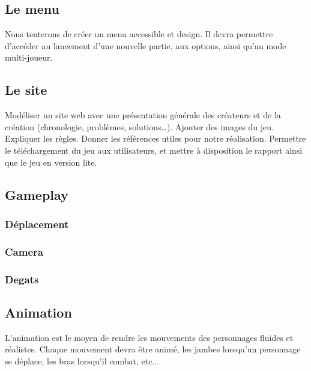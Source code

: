 \documentclass[a4paper, 12pt]{article}
\begin{document}
	\subsection{Le menu}
	Nous tenterons de créer un menu accessible et design. Il devra permettre d'accéder au lancement d’une nouvelle partie, aux options, ainsi qu’au mode multi-joueur. 
	\subsection{Le site}
	Modéliser un site web avec une présentation générale des créateurs et de la création (chronologie, problèmes, solutions…). Ajouter des images du jeu. Expliquer les règles.  Donner les références utiles pour notre réalisation. Permettre le téléchargement du jeu aux utilisateurs, et mettre à disposition le rapport ainsi que le jeu en version lite.
	\subsection{Gameplay}
		\subsubsection{Déplacement}
		\subsubsection{Camera}
		\subsubsection{Degats}
	\subsection{Animation}
	L’animation est le moyen de rendre les mouvements des personnages fluides et réalistes. Chaque mouvement devra être animé, les jambes lorsqu’un personnage se déplace, les bras lorsqu’il combat, etc...

\newpage
\end{document}
